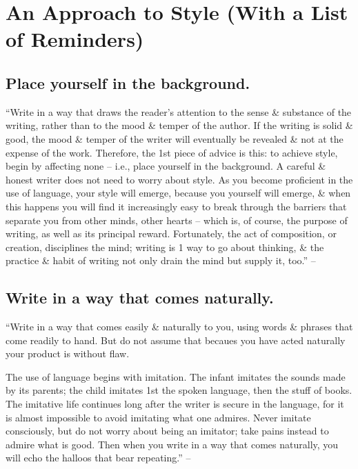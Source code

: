 \documentclass{article}
\numberwithin{equation}{section}
\begin{document}
\section{An Approach to Style (With a List of Reminders)}

\subsection{Place yourself in the background.}
``Write in a way that draws the reader's attention to the sense \& substance of the writing, rather than to the mood \& temper of the author. If the writing is solid \& good, the mood \& temper of the writer will eventually be revealed \& not at the expense of the work. Therefore, the 1st piece of advice is this: to achieve style, begin by affecting none -- i.e., place yourself in the background. A careful \& honest writer does not need to worry about style. As you become proficient in the use of language, your style will emerge, because you yourself will emerge, \& when this happens you will find it increasingly easy to break through the barriers that separate you from other minds, other hearts -- which is, of course, the purpose of writing, as well as its principal reward. Fortunately, the act of composition, or creation, disciplines the mind; writing is 1 way to go about thinking, \& the practice \& habit of writing not only drain the mind but supply it, too.'' -- \cite[p. 78]{Strunk_White2019}


\subsection{Write in a way that comes naturally.}
``Write in a way that comes easily \& naturally to you, using words \& phrases that come readily to hand. But do not assume that becaues you have acted naturally your product is without flaw.

The use of language begins with imitation. The infant imitates the sounds made by its parents; the child imitates 1st the spoken language, then the stuff of books. The imitative life continues long after the writer is secure in the language, for it is almost impossible to avoid imitating what one admires. Never imitate consciously, but do not worry about being an imitator; take pains instead to admire what is good. Then when you write in a way that comes naturally, you will echo the halloos that bear repeating.'' -- \cite[p. 79]{Strunk_White2019}
\end{document}
